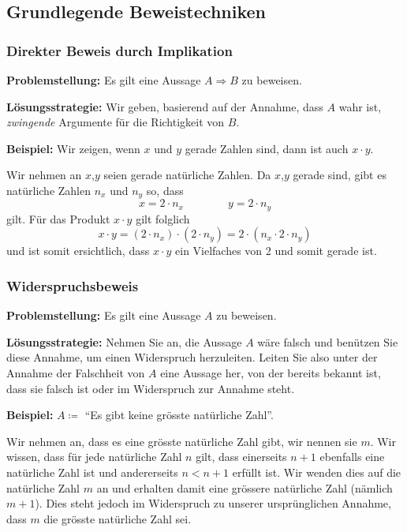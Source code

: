 \newpage

\subsection{Grundlegende Beweistechniken}\label{subsec:grundlegende-beweistechniken}

\subsubsection{Direkter Beweis durch Implikation}

\textbf{Problemstellung:} Es gilt eine Aussage $A \Rightarrow B$ zu beweisen.

\textbf{Lösungsstrategie:} Wir geben, basierend auf der Annahme, dass $A$ wahr ist, \emph{zwingende} Argumente für die Richtigkeit von $B$.

\textbf{Beispiel:} Wir zeigen, wenn $x$ und $y$ gerade Zahlen sind, dann ist auch $x \cdot y$.

Wir nehmen an $x$,$y$ seien gerade natürliche Zahlen.
Da $x$,$y$ gerade sind, gibt es natürliche Zahlen $n_x$ und $n_y$ so, dass \[x = 2 \cdot n_x \qquad \qquad y = 2 \cdot n_y\] gilt.
Für das Produkt $x \cdot y$ gilt folglich
\[ x \cdot y = (2 \cdot n_x) \cdot (2 \cdot n_y) = 2 \cdot (n_x \cdot 2 \cdot n_y)\] und ist somit ersichtlich, dass $x \cdot y$ ein Vielfaches von 2 und somit gerade ist.

\subsubsection{Widerspruchsbeweis}

\textbf{Problemstellung:} Es gilt eine Aussage $A$ zu beweisen.

\textbf{Lösungsstrategie:} Nehmen Sie an, die Aussage $A$ wäre falsch und benützen Sie diese Annahme, um einen Widerspruch herzuleiten.
Leiten Sie also unter der Annahme der Falschheit von $A$ eine Aussage her, von der bereits bekannt ist, dass sie falsch ist oder im Widerspruch zur Annahme steht.

\textbf{Beispiel:} $A \coloneqq$ ``Es gibt keine grösste natürliche Zahl''.

Wir nehmen an, dass es eine grösste natürliche Zahl gibt, wir nennen sie $m$.
Wir wissen, dass für jede natürliche Zahl $n$ gilt, dass einerseits $n + 1$ ebenfalls eine natürliche Zahl ist und andererseits $n < n + 1$ erfüllt ist.
Wir wenden dies auf die natürliche Zahl $m$ an und erhalten damit eine grössere natürliche Zahl (nämlich $m + 1$).
Dies steht jedoch im Widerspruch zu unserer ursprünglichen Annahme, dass $m$ die grösste natürliche Zahl sei.

